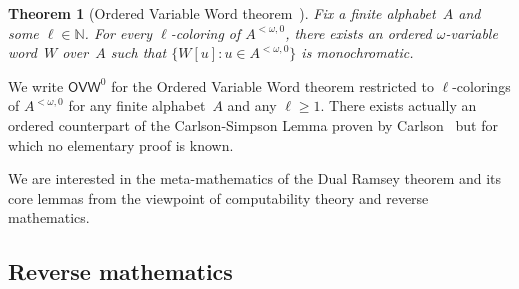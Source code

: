 \documentclass{article}
\newcommand{\OVW}[0]{\mathsf{OVW}}
\newcommand{\NN}[0]{\mathbb{N}}
\newtheorem{theorem}{Theorem}
\numberwithin{theorem}{section}
\theoremstyle{definition}
\begin{document}
\begin{theorem}[Ordered Variable Word theorem~\cite{carlson1984dual}]
Fix a finite alphabet~$A$ and some $\ell \in \NN$. For every $\ell$-coloring of $A^{<\omega, 0}$,
there exists an ordered $\omega$-variable word~$W$ over~$A$ such that $\{ W[u] : u \in A^{<\omega, 0} \}$ is monochromatic.
\end{theorem}

We write $\OVW^0$ for the Ordered Variable Word theorem restricted to $\ell$-colorings of $A^{<\omega, 0}$ for any finite alphabet~$A$ and any $\ell \geq 1$. There exists actually an ordered counterpart of the Carlson-Simpson Lemma proven by Carlson~\cite{carlson1988unifying} but for which no elementary proof is known. 

We are interested in the meta-mathematics of the Dual Ramsey theorem and its core lemmas from the viewpoint of computability theory and reverse mathematics.

\subsection{Reverse mathematics}
\end{document}
